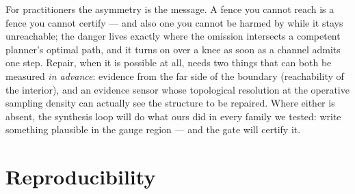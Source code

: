 \documentclass[11pt]{article}
\theoremstyle{remark}
\begin{document}
For practitioners the asymmetry is the message. A fence you cannot reach
is a fence you cannot certify --- and also one you cannot be harmed by
while it stays unreachable; the danger lives exactly where the omission
intersects a competent planner's optimal path, and it turns on over a knee
as soon as a channel admits one step. Repair, when it is possible at all,
needs two things that can both be measured \emph{in advance}: evidence
from the far side of the boundary (reachability of the interior), and an
evidence sensor whose topological resolution at the operative sampling
density can actually see the structure to be repaired. Where either is
absent, the synthesis loop will do what ours did in every family we
tested: write something plausible in the gauge region --- and the gate
will certify it.

\section*{Reproducibility}
\end{document}
